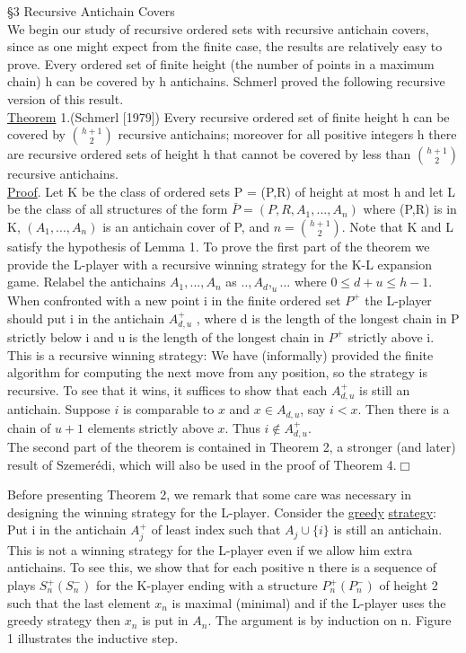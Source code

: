 \documentclass[twoside]{article}
\begin{document}
\noindent\S 3   Recursive Antichain Covers\\
\newline
\indent We begin our study of recursive ordered sets with recursive antichain covers, since as one might expect from the finite case,  the results are relatively easy to prove.   
Every ordered set of finite height (the number of points in a maximum chain) h   can be covered by   h   antichains. 
Schmerl proved the following recursive version of this result.\\
\newline
\underline{Theorem} 1.(Schmerl [1979])   Every recursive ordered set of finite height h can be covered by $\binom{h+1}{2}$  recursive antichains; moreover for all positive integers   h there are recursive ordered sets of height   h   that cannot be covered by less than $\binom{h+1}{2}$ recursive antichains.\\
\newline
\underline{Proof}. Let K be the class of ordered sets P = (P,R) of height at most h and let L be the class of all structures of the form $\bar{P} = (P,R,A_1,...,A_n)$ where (P,R) is in K, $(A_1,...,A_n)$ is an antichain cover of P, and $n = \binom{h+1}{2}$. Note that K and L satisfy the hypothesis of Lemma 1. 
To prove the first part of the theorem we provide the L-player with a recursive winning strategy for the K-L expansion game. Relabel the antichains $A_1,...,A_n$ as $..,A_d,_u...$ where $0 \leq d+u \leq h-1$.   
When confronted with a new point i in the
finite ordered set $P^+$ the L-player should put i in the antichain $A_{d,u}^+$   , where d  is the length of the longest chain in P   strictly below i and u is the
length of the longest chain in $P^+$ strictly above i.   This is a recursive
winning strategy: We have (informally) provided the finite algorithm for
computing the next move from any position, so the strategy is recursive. To
see that it wins, it suffices to show that each $A_{d,u}^+$  is still an antichain.
Suppose $i$ is comparable to $x$ and $x \in A_{d,u}$, say $i < x$. Then there is a chain of $u + 1$ elements strictly above $x$. Thus $i \not \in A_{d,u}^+$.\\
\indent The second part of the theorem is contained in Theorem 2, a stronger (and later) result of Szemer\'{e}di, which will also be used in the proof of Theorem 4.$\Box$

\newpage
%
%


Before presenting Theorem 2, we remark that some care was necessary in designing the winning strategy for the   L-player.   Consider the \underline{greedy} \underline{strategy}:    Put    i    in the antichain  $A_j^+$   of least index such that   $A_j \cup  \{i\}$ is    still an antichain.    
This is not a winning strategy for the   L-player even if we allow him extra antichains.    
To see this, we show that for each positive n    there is a sequence of plays $S_n^+  (S_n^-)$   for the   K-player ending with a
structure $P_n^+  (P_n^-)$   of height   2   such that the last element $x_n$    is maximal
(minimal) and if the   L-player uses the greedy strategy then $x_n$   is put in $A_n$.   The argument is by induction on   n.    Figure 1 illustrates the inductive step.
\end{document}
